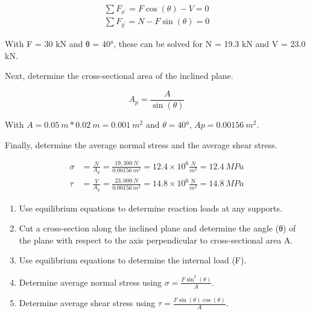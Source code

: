 \documentclass[
  letterpaper,
  DIV=11,
  numbers=noendperiod]{scrreprt}
\theoremstyle{definition}
\theoremstyle{remark}
\begin{document}
\begin{tcolorbox}
\begin{tcolorbox}
\[
\begin{aligned}
\sum F_{x^{\prime}}= F \cos (\theta)-V=0 \\
\sum F_{y^{\prime}}= N-F \sin (\theta)=0
\end{aligned}
\]

With F = 30 kN and θ = 40°, these can be solved for N = 19.3 kN and V =
23.0 kN.

Next, determine the cross-sectional area of the inclined plane.

\[
A_p=\frac{A}{\sin (\theta)}
\]

With \(A = 0.05{~m}*0.02{~m} = 0.001{~m}^2\) and \(θ = 40°\),
\(Ap = 0.00156{~m}^2\).

Finally, determine the average normal stress and the average shear
stress.

\[
\begin{aligned}
\sigma & =\frac{N}{A_p}=\frac{19,300{~N}}{0.00156{~m}^2}=12.4 \times 10^6 \frac{{N}}{m^2}=12.4{~MPa} \\
\tau & =\frac{V}{A_p}=\frac{23,000{~N}}{0.00156{~m}^2}=14.8 \times 10^6 \frac{\mathrm{N}}{m^2}=14.8{~MPa}
\end{aligned}
\]

\end{tcolorbox}

\end{tcolorbox}

\begin{tcolorbox}[enhanced jigsaw, leftrule=.75mm, colbacktitle=quarto-callout-warning-color!10!white, breakable, opacityback=0, colback=white, titlerule=0mm, toprule=.15mm, colframe=quarto-callout-warning-color-frame, coltitle=black, title={Step-by-step: Stresses on Inclined Planes}, toptitle=1mm, bottomrule=.15mm, rightrule=.15mm, left=2mm, arc=.35mm, opacitybacktitle=0.6, bottomtitle=1mm]

\begin{enumerate}
\def\labelenumi{\arabic{enumi}.}
\item
  Use equilibrium equations to determine reaction loads at any supports.
\item
  Cut a cross-section along the inclined plane and determine the angle
  (θ) of the plane with respect to the axis perpendicular to
  cross-sectional area A.
\item
  Use equilibrium equations to determine the internal load (F).
\item
  Determine average normal stress using
  \(\sigma=\frac{F \sin ^2(\theta)}{A}\).
\item
  Determine average shear stress using
  \(\tau=\frac{F \sin (\theta) \cos (\theta)}{A}\).
\end{enumerate}

\end{tcolorbox}
\end{document}
